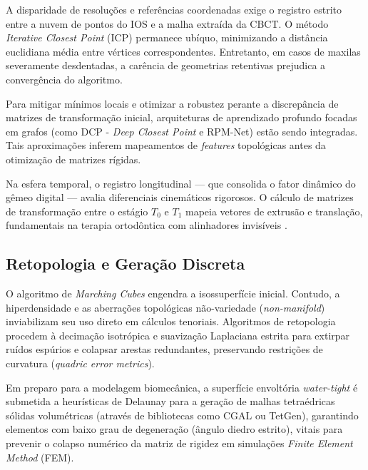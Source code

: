 A disparidade de resoluções e referências coordenadas exige o registro estrito entre a nuvem de pontos do IOS e a malha extraída da CBCT. O método \textit{Iterative Closest Point} (ICP) permanece ubíquo, minimizando a distância euclidiana média entre vértices correspondentes. Entretanto, em casos de maxilas severamente desdentadas, a carência de geometrias retentivas prejudica a convergência do algoritmo.

Para mitigar mínimos locais e otimizar a robustez perante a discrepância de matrizes de transformação inicial, arquiteturas de aprendizado profundo focadas em grafos (como DCP - \textit{Deep Closest Point} e RPM-Net) estão sendo integradas. Tais aproximações inferem mapeamentos de \textit{features} topológicas antes da otimização de matrizes rígidas.

Na esfera temporal, o registro longitudinal — que consolida o fator dinâmico do gêmeo digital — avalia diferenciais cinemáticos rigorosos. O cálculo de matrizes de transformação entre o estágio $T_0$ e $T_1$ mapeia vetores de extrusão e translação, fundamentais na terapia ortodôntica com alinhadores invisíveis \cite{li2024aligner}.

\subsection{Retopologia e Geração Discreta}
\label{subsec:malha}

O algoritmo de \textit{Marching Cubes} engendra a isossuperfície inicial. Contudo, a hiperdensidade e as aberrações topológicas não-variedade (\textit{non-manifold}) inviabilizam seu uso direto em cálculos tenoriais. Algoritmos de retopologia procedem à decimação isotrópica e suavização Laplaciana estrita para extirpar ruídos espúrios e colapsar arestas redundantes, preservando restrições de curvatura (\textit{quadric error metrics}).

Em preparo para a modelagem biomecânica, a superfície envoltória \textit{water-tight} é submetida a heurísticas de Delaunay para a geração de malhas tetraédricas sólidas volumétricas (através de bibliotecas como CGAL ou TetGen), garantindo elementos com baixo grau de degeneração (ângulo diedro estrito), vitais para prevenir o colapso numérico da matriz de rigidez em simulações \textit{Finite Element Method} (FEM).
